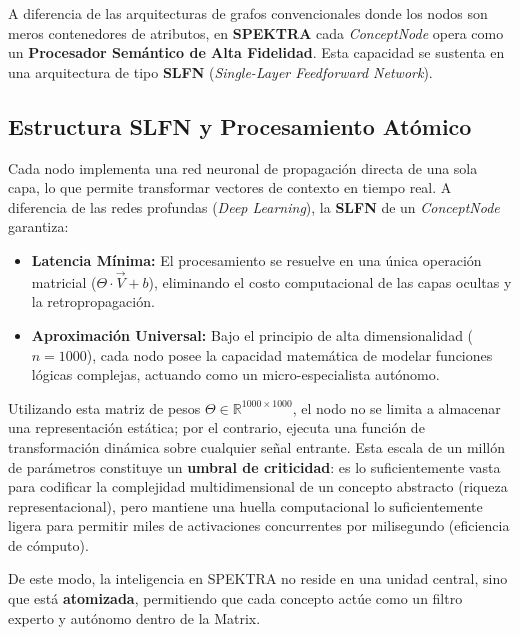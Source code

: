 \documentclass[12pt]{article}
\begin{document}
A diferencia de las arquitecturas de grafos convencionales donde los nodos son meros contenedores de atributos, en \textbf{SPEKTRA} cada \textit{ConceptNode} opera como un \textbf{Procesador Semántico de Alta Fidelidad}. Esta capacidad se sustenta en una arquitectura de tipo \textbf{SLFN} (\textit{Single-Layer Feedforward Network}).

\subsection{Estructura SLFN y Procesamiento Atómico}
Cada nodo implementa una red neuronal de propagación directa de una sola capa, lo que permite transformar vectores de contexto en tiempo real. A diferencia de las redes profundas (\textit{Deep Learning}), la \textbf{SLFN} de un \textit{ConceptNode} garantiza:
\begin{itemize}
	\item \textbf{Latencia Mínima:} El procesamiento se resuelve en una única operación matricial ($\Theta \cdot \vec{V} + b$), eliminando el costo computacional de las capas ocultas y la retropropagación.
	\item \textbf{Aproximación Universal:} Bajo el principio de alta dimensionalidad ($n=1000$), cada nodo posee la capacidad matemática de modelar funciones lógicas complejas, actuando como un micro-especialista autónomo.
\end{itemize}



Utilizando esta matriz de pesos $\Theta \in \mathbb{R}^{1000 \times 1000}$, el nodo no se limita a almacenar una representación estática; por el contrario, ejecuta una función de transformación dinámica sobre cualquier señal entrante. Esta escala de un millón de parámetros constituye un \textbf{umbral de criticidad}: es lo suficientemente vasta para codificar la complejidad multidimensional de un concepto abstracto (riqueza representacional), pero mantiene una huella computacional lo suficientemente ligera para permitir miles de activaciones concurrentes por milisegundo (eficiencia de cómputo).

De este modo, la inteligencia en SPEKTRA no reside en una unidad central, sino que está \textbf{atomizada}, permitiendo que cada concepto actúe como un filtro experto y autónomo dentro de la Matrix.
\end{document}
